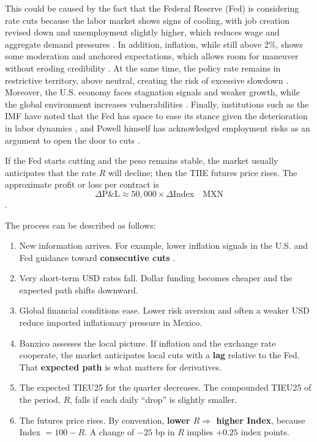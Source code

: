 \documentclass[10pt,a4paper]{article} %
\begin{document}
This could be caused by the fact that the Federal Reserve (Fed) is considering rate cuts because the labor market shows signs of cooling, with job creation revised down and unemployment slightly higher, which reduces wage and aggregate demand pressures \citep{reuters2025a}. In addition, inflation, while still above 2\%, shows some moderation and anchored expectations, which allows room for maneuver without eroding credibility \citep{ycharts2025}. At the same time, the policy rate remains in restrictive territory, above neutral, creating the risk of excessive slowdown \citep{ycharts2025}. Moreover, the U.S. economy faces stagnation signals and weaker growth, while the global environment increases vulnerabilities \citep{reuters2025b}. Finally, institutions such as the IMF have noted that the Fed has space to ease its stance given the deterioration in labor dynamics \citep{reuters2025c}, and Powell himself has acknowledged employment risks as an argument to open the door to cuts \citep{reuters2025d}.

If the Fed starts cutting and the peso remains stable, the market usually anticipates that the rate $R$ will decline; then the TIIE futures price rises. The approximate profit or loss per contract is 
\[
\Delta \text{P\&L} \approx 50{,}000 \times \Delta \text{Index} \quad \text{MXN}
\]
\citep{banxico2023,cme2025a,cme2025b,reuters2025a}. 

The process can be described as follows:

\begin{enumerate}
    \item New information arrives. For example, lower inflation signals in the U.S. and Fed guidance toward \textbf{consecutive cuts} \citep{reuters2025}.
    \item Very short-term USD rates fall. Dollar funding becomes cheaper and the expected path shifts downward.
    \item Global financial conditions ease. Lower risk aversion and often a weaker USD reduce imported inflationary pressure in Mexico.
    \item Banxico assesses the local picture. If inflation and the exchange rate cooperate, the market anticipates local cuts with a \textbf{lag} relative to the Fed. That \textbf{expected path} is what matters for derivatives.
    \item The expected TIEU25 for the quarter decreases. The compounded TIEU25 of the period, $R$, falls if each daily ``drop'' is slightly smaller.
    \item The futures price rises. By convention, \textbf{lower $R \Rightarrow$ higher Index}, because Index $= 100 - R$. A change of $-25$ bp in $R$ implies $+\!0.25$ index points.
\end{enumerate}
\end{document}
